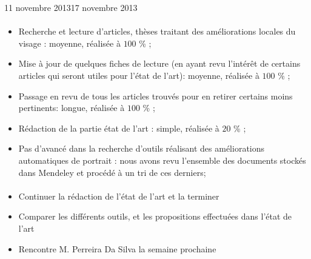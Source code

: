 \documentclass[11pt, french]{report-rd-info}
\begin{document}
\begin{fichesuivi}{11 novembre 2013}{17 novembre 2013}

\paragraph{}
	\begin{travaileffectue}
		\begin{itemize}
			\item Recherche et lecture d'articles, thèses traitant des améliorations locales du visage : moyenne, réalisée à $100$ \% ;
			\item Mise à jour de quelques fiches de lecture (en ayant revu l’intérêt de certains articles qui seront utiles pour l’état de l’art): moyenne, réalisée à $100$ \% ;
			\item Passage en revu de tous les articles trouvés pour en retirer certains moins pertinents: longue, réalisée à $100$ \% ;
			\item Rédaction de la partie état de l’art : simple, réalisée à $20$ \% ;
\end{itemize}
	\end{travaileffectue}

\begin{travailnoneffectue}
		\begin{itemize}
			\item Pas d’avancé dans la recherche d'outils réalisant des améliorations automatiques de portrait : nous avons revu l’ensemble des documents stockés dans Mendeley et procédé à un tri de ces derniers;
		\end{itemize}
	\end{travailnoneffectue}
		
\paragraph{}
	\begin{planification}
		\begin{itemize}
			\item Continuer la rédaction de l’état de l’art et la terminer 
			\item Comparer les différents outils, et les propositions effectuées dans l’état de l’art
			\item Rencontre M. Perreira Da Silva la semaine prochaine		
		\end{itemize}
	\end{planification}
\end{fichesuivi}
\end{document}
